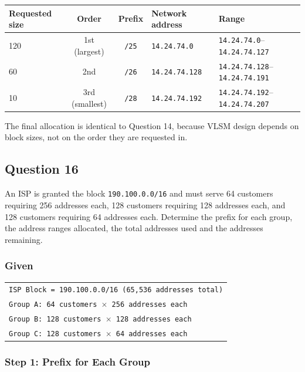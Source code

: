 \documentclass[11pt,a4paper]{article}
\begin{document}
\begin{tabularx}{\textwidth}{@{}lccll@{}}
\toprule
\rowcolor{tablehead}\textbf{Requested size} & \textbf{Order} & \textbf{Prefix} & \textbf{Network address} & \textbf{Range} \\
\midrule
120 & 1st (largest) & \texttt{/25} & \texttt{14.24.74.0} & \texttt{14.24.74.0}--\texttt{14.24.74.127} \\
60 & 2nd & \texttt{/26} & \texttt{14.24.74.128} & \texttt{14.24.74.128}--\texttt{14.24.74.191} \\
10 & 3rd (smallest) & \texttt{/28} & \texttt{14.24.74.192} & \texttt{14.24.74.192}--\texttt{14.24.74.207} \\
\bottomrule
\end{tabularx}

The final allocation is identical to Question 14, because VLSM design depends on
block sizes, not on the order they are requested in.

\subsection*{Question 16}

An ISP is granted the block \texttt{190.100.0.0/16} and must serve 64 customers requiring 256
addresses each, 128 customers requiring 128 addresses each, and 128 customers requiring 64
addresses each. Determine the prefix for each group, the address ranges allocated, the total
addresses used and the addresses remaining.

\subsubsection*{Given}

\begin{tabularx}{\textwidth}{@{}X@{}}
\texttt{ISP Block = 190.100.0.0/16 (65,536 addresses total)} \\
\texttt{Group A: 64 customers $\times$ 256 addresses each} \\
\texttt{Group B: 128 customers $\times$ 128 addresses each} \\
\texttt{Group C: 128 customers $\times$ 64 addresses each} \\
\end{tabularx}

\subsubsection*{Step 1: Prefix for Each Group}
\end{document}
